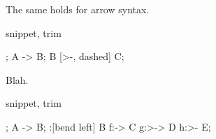 The same holds for arrow syntax.

\begin{tcblisting}{snippet, trim}
\begin{kodi}
;
\mor A -> B;
\mor B [>-, dashed] C;
\end{kodi}
\end{tcblisting}

Blah.

\begin{tcblisting}{snippet, trim}
\begin{kodi}
;
\mor A -> B;
\mor [swap]:[bend left] B f:-> C g:>-> D h:>- E;
\end{kodi}
\end{tcblisting}

\endgroup
